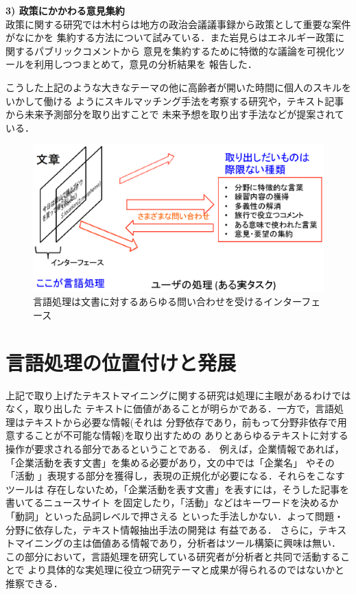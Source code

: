 \documentclass[twocolumn]{jarticle}
\begin{document}
{\bf 3) 政策にかかわる意見集約}\\
政策に関する研究では木村らは地方の政治会議議事録から政策として重要な案件がなにかを
集約する方法について試みている．また岩見らはエネルギー政策に関するパブリックコメントから
意見を集約するために特徴的な議論を可視化ツールを利用しつつまとめて，意見の分析結果を
報告した．

こうした上記のような大きなテーマの他に高齢者が開いた時間に個人のスキルをいかして働ける
ようにスキルマッチング手法を考察する研究や，テキスト記事から未来予測部分を取り出すことで
未来予想を取り出す手法などが提案されている．

\begin{figure}[t]
\begin{center}
\includegraphics[scale=0.4]{fig/lang.eps}
\end{center}
\caption {言語処理は文書に対するあらゆる問い合わせを受けるインターフェース}
\label{fig:lang}
\end{figure}


\section{言語処理の位置付けと発展}
上記で取り上げたテキストマイニングに関する研究は処理に主眼があるわけではなく，取り出した
テキストに価値があることが明らかである．一方で，言語処理はテキストから必要な情報(それは
分野依存であり，前もって分野非依存で用意することが不可能な情報)を取り出すための
ありとあらゆるテキストに対する操作が要求される部分であるということである．
例えば，企業情報であれば，「企業活動を表す文書」を集める必要があり，文の中では「企業名」
やその「活動 」表現する部分を獲得し，表現の正規化が必要になる．それらをこなすツールは
存在しないため，「企業活動を表す文書」を表すには，そうした記事を書いてるニュースサイト
を固定したり，「活動」などはキーワードを決めるか「動詞」といった品詞レベルで押さえる
といった手法しかない．よって問題・分野に依存した，テキスト情報抽出手法の開発は
有益である．
さらに，テキストマイニングの主は価値ある情報であり，分析者はツール構築に興味は無い．
この部分において，言語処理を研究している研究者が分析者と共同で活動することで
より具体的な実処理に役立つ研究テーマと成果が得られるのではないかと推察できる．




\end{document}
